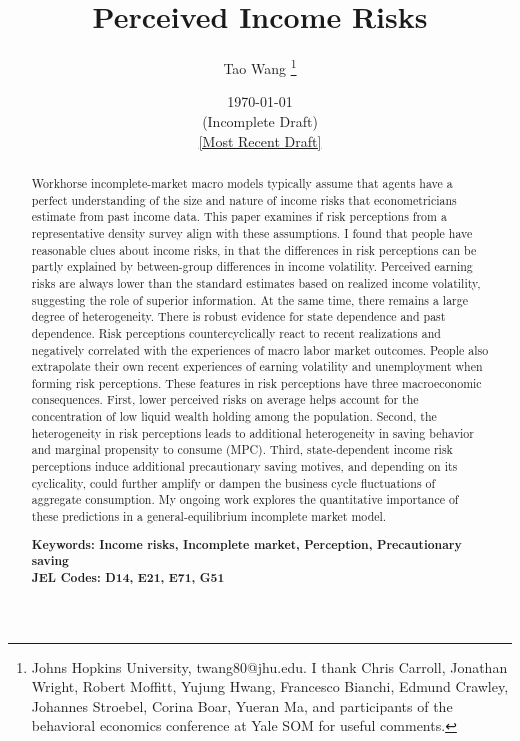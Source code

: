 \begin{titlepage}
 \title{Perceived Income Risks}
 
 \author{Tao Wang \thanks{Johns Hopkins University, twang80@jhu.edu. I thank Chris Carroll, Jonathan Wright, Robert Moffitt, Yujung Hwang, Francesco Bianchi, Edmund Crawley, Johannes Stroebel, Corina Boar, Yueran Ma, and participants of the behavioral economics conference at Yale SOM for useful comments.}}

\date{\today \\(Incomplete Draft) \\\href{https://github.com/TaoWangEcon/TaoWangEcon.github.io/blob/master/papers/PerceivedIncomeRisk.pdf}{[Most Recent Draft]}}
	\maketitle
	\begin{abstract}
	\begin{singlespace}
		\noindent Workhorse incomplete-market macro models typically assume that agents have a perfect understanding of the size and nature of income risks that econometricians estimate from past income data. This paper examines if risk perceptions from a representative density survey align with these assumptions. I found that people have reasonable clues about income risks, in that the differences in risk perceptions can be partly explained by between-group differences in income volatility. Perceived earning risks are always lower than the standard estimates based on realized income volatility, suggesting the role of superior information. At the same time, there remains a large degree of heterogeneity. There is robust evidence for state dependence and past dependence. Risk perceptions countercyclically react to recent realizations and negatively correlated with the experiences of macro labor market outcomes. People also extrapolate their own recent experiences of earning volatility and unemployment when forming risk perceptions. These features in risk perceptions have three macroeconomic consequences. First, lower perceived risks on average helps account for the concentration of low liquid wealth holding among the population. Second, the heterogeneity in risk perceptions leads to additional heterogeneity in saving behavior and marginal propensity to consume (MPC). Third, state-dependent income risk perceptions induce additional precautionary saving motives, and depending on its cyclicality, could further amplify or dampen the business cycle fluctuations of aggregate consumption. My ongoing work explores the quantitative importance of these predictions in a general-equilibrium incomplete market model. 
	\end{singlespace}

		\noindent \textbf{Keywords: Income risks, Incomplete market, Perception, Precautionary saving } \\
		\noindent \textbf{JEL Codes: D14, E21, E71, G51} 

	\end{abstract}

\end{titlepage}
